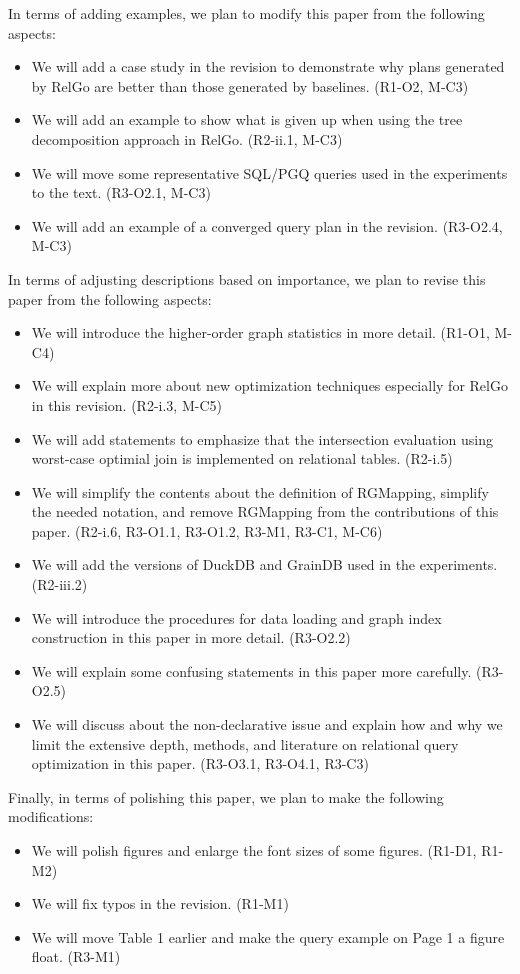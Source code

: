In terms of adding examples, we plan to modify this paper from the following aspects:
\begin{itemize}
    \item We will add a case study in the revision to demonstrate why plans generated by RelGo are better than those generated by baselines. (R1-O2, M-C3)
    \item We will add an example to show what is given up when using the tree decomposition approach in RelGo. (R2-ii.1, M-C3)
    \item We will move some representative SQL/PGQ queries used in the experiments to the text. (R3-O2.1, M-C3)
    \item We will add an example of a converged query plan in the revision. (R3-O2.4, M-C3)
\end{itemize}

In terms of adjusting descriptions based on importance, we plan to revise this paper from the following aspects:
\begin{itemize}
    \item We will introduce the higher-order graph statistics in more detail. (R1-O1, M-C4)
    \item We will explain more about new optimization techniques especially for RelGo in this revision. (R2-i.3, M-C5)
    \item We will add statements to emphasize that the intersection evaluation using worst-case optimial join is implemented on relational tables. (R2-i.5)
    \item We will simplify the contents about the definition of RGMapping, simplify the needed notation, and remove RGMapping from the contributions of this paper. (R2-i.6, R3-O1.1, R3-O1.2, R3-M1, R3-C1, M-C6)
    \item We will add the versions of DuckDB and GrainDB used in the experiments. (R2-iii.2)
    \item We will introduce the procedures for data loading and graph index construction in this paper in more detail. (R3-O2.2)
    \item We will explain some confusing statements in this paper more carefully. (R3-O2.5)
    \item We will discuss about the non-declarative issue and explain how and why we limit the extensive depth, methods, and literature on relational query optimization in this paper. (R3-O3.1, R3-O4.1, R3-C3)
\end{itemize}

Finally, in terms of polishing this paper, we plan to make the following modifications:
\begin{itemize}
    \item We will polish figures and enlarge the font sizes of some figures. (R1-D1, R1-M2)
    \item We will fix typos in the revision. (R1-M1)
    \item We will move Table 1 earlier and make the query example on Page 1 a figure float. (R3-M1)
\end{itemize}

